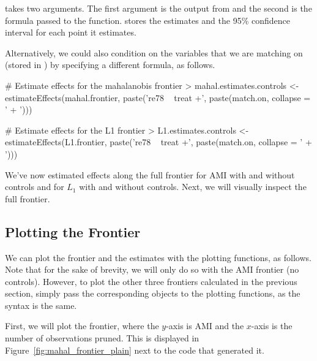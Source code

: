\documentclass[nojss]{jss}
\begin{document}
 takes two arguments. The first argument is
the output from  and the second is the formula
passed to the  function.  stores the
estimates and the 95\% confidence interval for each point it
estimates.

Alternatively, we could also condition on the variables that we are
matching on (stored in ) by specifying a different
formula, as follows.

\begin{CodeChunk}
\begin{CodeInput}
# Estimate effects for the mahalanobis frontier
> mahal.estimates.controls <- 
        estimateEffects(mahal.frontier, paste('re78 ~ treat +', 
                                        paste(match.on, collapse = ' + ')))

# Estimate effects for the L1 frontier
> L1.estimates.controls <- 
     estimateEffects(L1.frontier, paste('re78 ~ treat +', 
                                  paste(match.on, collapse = ' + ')))
\end{CodeInput}
\end{CodeChunk}

We've now estimated effects along the full frontier for AMI with and
without controls and for $L_1$ with and without controls. Next, we
will visually inspect the full frontier.

\subsection{Plotting the Frontier}

We can plot the frontier and the estimates with the plotting
functions, as follows. Note that for the sake of brevity, we will only
do so with the AMI frontier (no controls). However, to plot the other
three frontiers calculated in the previous section, simply pass the
corresponding objects to the plotting functions, as the syntax is the
same.

First, we will plot the frontier, where the $y$-axis is AMI and the
$x$-axis is the number of observations pruned. This is displayed in
Figure~\ref{fig:mahal_frontier_plain} next to the code that generated
it.
\end{document}
